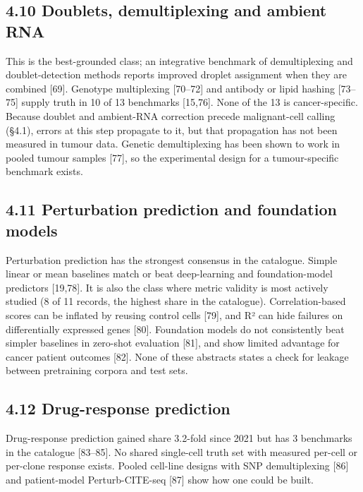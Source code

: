 \documentclass{article}
\begin{document}
\subsection{4.10 Doublets, demultiplexing and ambient RNA}\label{doublets-demultiplexing-and-ambient-rna}

This is the best-grounded class; an integrative benchmark of
demultiplexing and doublet-detection methods reports improved droplet
assignment when they are combined {[}69{]}. Genotype multiplexing
{[}70--72{]} and antibody or lipid hashing {[}73--75{]} supply truth in
10 of 13 benchmarks {[}15,76{]}. None of the 13 is cancer-specific.
Because doublet and ambient-RNA correction precede malignant-cell
calling (§4.1), errors at this step propagate to it, but that
propagation has not been measured in tumour data. Genetic demultiplexing
has been shown to work in pooled tumour samples {[}77{]}, so the
experimental design for a tumour-specific benchmark exists.

\subsection{4.11 Perturbation prediction and foundation models}\label{perturbation-prediction-and-foundation-models}

Perturbation prediction has the strongest consensus in the catalogue.
Simple linear or mean baselines match or beat deep-learning and
foundation-model predictors {[}19,78{]}. It is also the class where
metric validity is most actively studied (8 of 11 records, the highest
share in the catalogue). Correlation-based scores can be inflated by
reusing control cells {[}79{]}, and R² can hide failures on
differentially expressed genes {[}80{]}. Foundation models do not
consistently beat simpler baselines in zero-shot evaluation {[}81{]},
and show limited advantage for cancer patient outcomes {[}82{]}. None of
these abstracts states a check for leakage between pretraining corpora
and test sets.

\subsection{4.12 Drug-response prediction}\label{drug-response-prediction}

Drug-response prediction gained share 3.2-fold since 2021 but has 3
benchmarks in the catalogue {[}83--85{]}. No shared single-cell truth
set with measured per-cell or per-clone response exists. Pooled
cell-line designs with SNP demultiplexing {[}86{]} and patient-model
Perturb-CITE-seq {[}87{]} show how one could be built.
\end{document}

